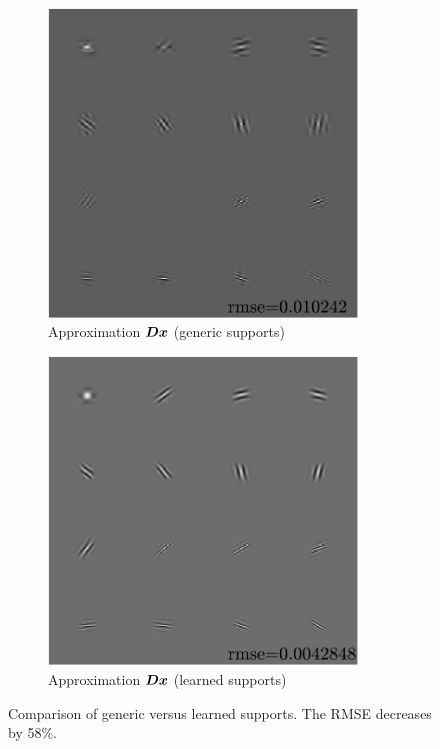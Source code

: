 \begin{figure} \ContinuedFloat
\begin{subfigure}[b]{0.49\textwidth}\centering
\includegraphics[width=0.9\textwidth]{figures/tree-learn-setup/xp_learnsupp256_curvelet_decomp3[tree-binary_dpth4]_supp-generic3x3_[fixed-supports]_approx.pdf}
	\caption{Approximation $\bm{D}\bm{x}$ (generic supports)}
\end{subfigure}
\begin{subfigure}[b]{0.49\textwidth}\centering
\includegraphics[width=0.9\textwidth]{figures/tree-gradient-vs-sequential/xp_learnsupp256_curvelet_decomp3_tree-binary_dpth4_supp-diracs_usegrad1_every5_add5_totinit0_totadd279_alpha30_approx.pdf} 
	\caption{Approximation $\bm{D}\bm{x}$ (learned supports)}
\end{subfigure}
\caption{Comparison of generic versus learned supports. The RMSE decreases by 58\%.}\label{fig_learnsupp_vs_generic}
\end{figure}

